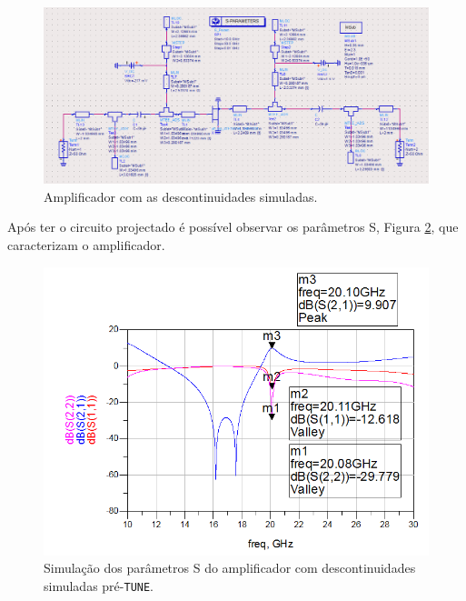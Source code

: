 \documentclass[11pt]{article}
\numberwithin{equation}{section}
\begin{document}
\begin{figure}[H]
	\centering
	\includegraphics[keepaspectratio=true, scale=0.45]{exps/Circuito_descont_pre_tune}
	\vspace{-0.5em}
	\caption{Amplificador com as descontinuidades simuladas.}
	\vspace{-0.8em}
	\label{fig:Circuito_pre_tune}
\end{figure}

Após ter o circuito projectado é possível observar os parâmetros S, Figura \ref{fig:descont_S_pre_tune}, que caracterizam o amplificador.

\begin{figure}[H]
	\centering
	\includegraphics[keepaspectratio=true, scale=0.45]{exps/descont_S_pre_tune}
	\vspace{-0.5em}
	\caption{Simulação dos parâmetros S do amplificador com descontinuidades simuladas pré-\texttt{TUNE}.}
	\vspace{-0.8em}
	\label{fig:descont_S_pre_tune}
\end{figure}
\end{document}
